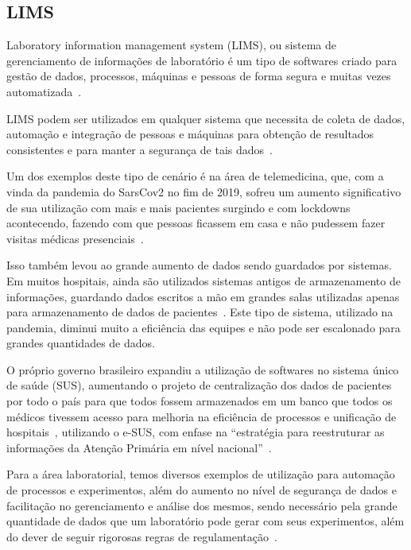 \subsection{LIMS}


Laboratory information management system (LIMS), ou sistema de gerenciamento de informações de laboratório é um tipo de softwares criado para gestão de dados, processos, máquinas e pessoas de forma segura e muitas vezes automatizada~\cite{Stafford1998LIMS:Technology}.


LIMS podem ser utilizados em qualquer sistema que necessita de coleta de dados, automação e integração de pessoas e máquinas para obtenção de resultados consistentes e para manter a segurança de tais dados~\cite{Sun2021LaboratoryEfficiency, TowardsXplore}.

Um dos exemplos deste tipo de cenário é na área de telemedicina, que, com a vinda da pandemia do SarsCov2 no fim de 2019, sofreu um aumento significativo de sua utilização com mais e mais pacientes surgindo e com lockdowns acontecendo, fazendo com que pessoas ficassem em casa e não pudessem fazer visitas médicas presenciais~\cite{kronenfeld2021, bakhtiar2020, GatesB.Colbert2020UtilityEra}.

Isso também levou ao grande aumento de dados sendo guardados por sistemas. Em muitos hospitais, ainda são utilizados sistemas antigos de armazenamento de informações, guardando dados escritos a mão em grandes salas utilizadas apenas para armazenamento de dados de pacientes~\cite{2021TacklingMachine}. Este tipo de sistema, utilizado na pandemia, diminui muito a eficiência das equipes e não pode ser escalonado para grandes quantidades de dados.


O próprio governo brasileiro expandiu a utilização de softwares no sistema único de saúde (SUS), aumentando o projeto de centralização dos dados de pacientes por todo o país para que todos fossem armazenados em um banco que todos os médicos tivessem acesso para melhoria na eficiência de processos e unificação de hospitais~\cite{Araujo2021DesafiosCovid-19}, utilizando o e-SUS, com enfase na ``estratégia para reestruturar as informações da Atenção Primária em nível nacional''~\cite{E-SUSAPS}.

Para a área laboratorial, temos diversos exemplos de utilização para automação de processos e experimentos, além do aumento no nível de segurança de dados e facilitação no gerenciamento e análise dos mesmos, sendo necessário pela grande quantidade de dados que um laboratório pode gerar com seus experimentos, além do dever de seguir rigorosas regras de regulamentação~\cite{Holzmuller-Laue2014ImprovedAutomation, Holzmuller-Laue2013Model-drivenLaboratories}.

